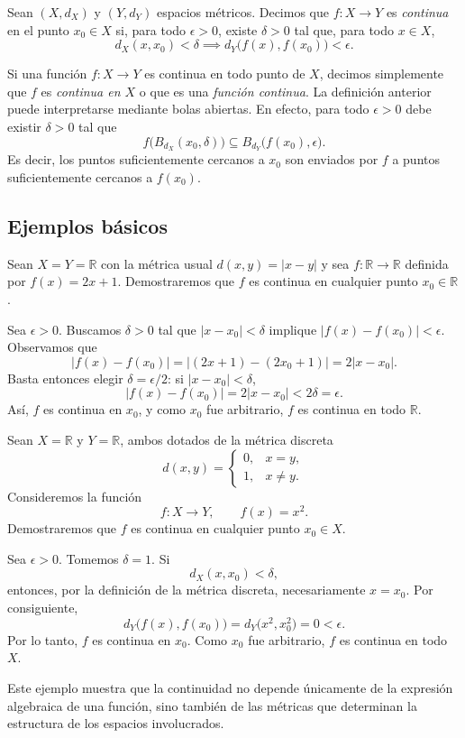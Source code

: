 \begin{definition}
\label{def:continuidad-metrica}
Sean $(X,d_X)$ y $(Y,d_Y)$ espacios métricos. Decimos que $f\colon X\to Y$ es \emph{continua} en el punto $x_0\in X$ si, para todo $\epsilon>0$, existe $\delta>0$ tal que, para todo $x\in X$,
\[
  d_X(x,x_0)<\delta\implies d_Y\bigl(f(x),f(x_0)\bigr)<\epsilon.
\]
\end{definition}
Si una función $f\colon X\to Y$ es continua en todo punto de $X$, decimos simplemente que $f$ es \emph{continua en $X$} o que es una \emph{función continua}. La definición anterior puede interpretarse mediante bolas abiertas. En efecto, para todo $\epsilon>0$ debe existir $\delta>0$ tal que
\[
  f\bigl(B_{d_X}(x_0,\delta)\bigr)\subseteq B_{d_Y}\bigl(f(x_0),\epsilon\bigr).
\]
Es decir, los puntos suficientemente cercanos a $x_0$ son enviados por $f$ a puntos suficientemente cercanos a $f(x_0)$.

\subsection{Ejemplos básicos}

\begin{example}
Sean $X=Y=\mathbb{R}$ con la métrica usual $d(x,y)=|x-y|$ y sea $f\colon\mathbb{R}\to\mathbb{R}$ definida por $f(x)=2x+1$. Demostraremos que $f$ es continua en cualquier punto $x_0\in\mathbb{R}$.

Sea $\epsilon>0$. Buscamos $\delta>0$ tal que $|x-x_0|<\delta$ implique $|f(x)-f(x_0)|<\epsilon$. Observamos que
\[
  |f(x)-f(x_0)|=|(2x+1)-(2x_0+1)|=2|x-x_0|.
\]
Basta entonces elegir $\delta=\epsilon/2$: si $|x-x_0|<\delta$,
\[
  |f(x)-f(x_0)|=2|x-x_0|<2\delta=\epsilon.
\]
Así, $f$ es continua en $x_0$, y como $x_0$ fue arbitrario, $f$ es continua en todo $\mathbb{R}$.
\end{example}

\begin{example}
Sean $X=\mathbb{R}$ y $Y=\mathbb{R}$, ambos dotados de la métrica discreta
\[
d(x,y)=
\begin{cases}
0, & x=y,\\
1, & x\neq y.
\end{cases}
\]
Consideremos la función
\[
f\colon X\to Y,
\qquad
f(x)=x^2.
\]
Demostraremos que $f$ es continua en cualquier punto $x_0\in X$.

Sea $\epsilon>0$. Tomemos $\delta=1$. Si
\[
d_X(x,x_0)<\delta,
\]
entonces, por la definición de la métrica discreta, necesariamente $x=x_0$. Por consiguiente,
\[
d_Y\bigl(f(x),f(x_0)\bigr)
=
d_Y\bigl(x^2,x_0^2\bigr)
=
0
<
\epsilon.
\]
Por lo tanto, $f$ es continua en $x_0$. Como $x_0$ fue arbitrario, $f$ es continua en todo $X$.

Este ejemplo muestra que la continuidad no depende únicamente de la expresión algebraica de una función, sino también de las métricas que determinan la estructura de los espacios involucrados.
\end{example}

